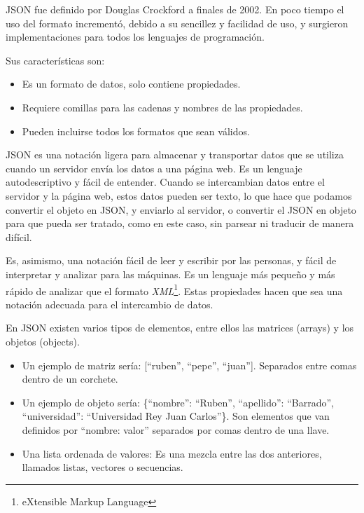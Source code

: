 \documentclass[a4paper, 12pt]{book}
\begin{document}
\vspace{5mm}
JSON fue definido por Douglas Crockford a finales de 2002. En poco tiempo el uso del formato incrementó, debido a su sencillez y facilidad de uso, y surgieron implementaciones para todos los lenguajes de programación. 

\vspace{5mm}
Sus características son:

\begin{itemize}
\item Es un formato de datos, solo contiene propiedades.
\item Requiere comillas para las cadenas y nombres de las propiedades.
\item Pueden incluirse todos los formatos que sean válidos.
\end{itemize}

\vspace{5mm}
JSON es una notación ligera para almacenar y transportar datos que se utiliza cuando un servidor envía los datos a una página web. Es un lenguaje autodescriptivo y fácil de entender. Cuando se intercambian datos entre el servidor y la página web, estos datos pueden ser texto, lo que hace que podamos convertir el objeto en JSON, y enviarlo al servidor, o convertir el JSON en objeto para que pueda ser tratado, como en este caso, sin parsear ni traducir de manera difícil.

Es, asimismo, una notación fácil de leer y escribir por las personas, y fácil de interpretar y analizar para las máquinas. Es un lenguaje más pequeño y más rápido de analizar que el formato \textit{XML}\footnote{eXtensible Markup Language}. Estas propiedades hacen que sea una notación adecuada para el intercambio de datos. 

\vspace{5mm}
En JSON existen varios tipos de elementos, entre ellos las matrices (arrays) y los objetos (objects). 
\begin{itemize}
\item Un ejemplo de matriz sería: [“ruben”, “pepe”, “juan”]. Separados entre comas dentro de un corchete.
\item Un ejemplo de objeto sería: \{“nombre”: “Ruben”, “apellido”: “Barrado”, “universidad”: “Universidad Rey Juan Carlos”\}. Son elementos que van definidos por “nombre: valor” separados por comas dentro de una llave.
\item Una lista ordenada de valores: Es una mezcla entre las dos anteriores, llamados listas, vectores o secuencias. 
\end{itemize}
\end{document}
